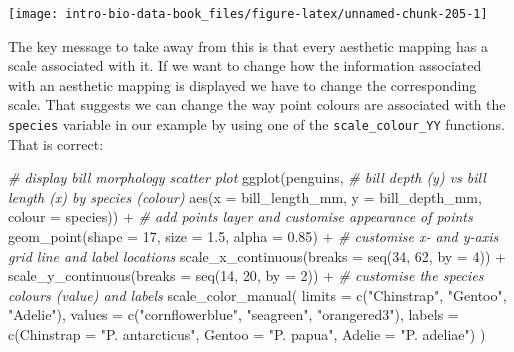 \documentclass[
]{book}
\newenvironment{Shaded}{\begin{snugshade}}{\end{snugshade}}
\newcommand{\AttributeTok}[1]{\textcolor[rgb]{0.77,0.63,0.00}{#1}}
\newcommand{\CommentTok}[1]{\textcolor[rgb]{0.56,0.35,0.01}{\textit{#1}}}
\newcommand{\DecValTok}[1]{\textcolor[rgb]{0.00,0.00,0.81}{#1}}
\newcommand{\FloatTok}[1]{\textcolor[rgb]{0.00,0.00,0.81}{#1}}
\newcommand{\FunctionTok}[1]{\textcolor[rgb]{0.00,0.00,0.00}{#1}}
\newcommand{\NormalTok}[1]{#1}
\newcommand{\SpecialCharTok}[1]{\textcolor[rgb]{0.00,0.00,0.00}{#1}}
\newcommand{\StringTok}[1]{\textcolor[rgb]{0.31,0.60,0.02}{#1}}
\begin{document}
\begin{center}\texttt{[image: intro-bio-data-book\_files/figure-latex/unnamed-chunk-205-1]} \end{center}

The key message to take away from this is that every aesthetic mapping has a scale associated with it. If we want to change how the information associated with an aesthetic mapping is displayed we have to change the corresponding scale. That suggests we can change the way point colours are associated with the \texttt{species} variable in our example by using one of the \texttt{scale\_colour\_YY} functions. That is correct:

\begin{Shaded}
\begin{Highlighting}[]
\CommentTok{\# display bill morphology scatter plot}
\FunctionTok{ggplot}\NormalTok{(penguins, }
       \CommentTok{\# bill depth (y) vs bill length (x) by species (colour)}
       \FunctionTok{aes}\NormalTok{(}\AttributeTok{x =}\NormalTok{ bill\_length\_mm, }\AttributeTok{y =}\NormalTok{ bill\_depth\_mm, }\AttributeTok{colour =}\NormalTok{ species)) }\SpecialCharTok{+} 
  \CommentTok{\# add points layer and customise appearance of points}
  \FunctionTok{geom\_point}\NormalTok{(}\AttributeTok{shape =} \DecValTok{17}\NormalTok{, }\AttributeTok{size =} \FloatTok{1.5}\NormalTok{, }\AttributeTok{alpha =} \FloatTok{0.85}\NormalTok{) }\SpecialCharTok{+} 
  \CommentTok{\# customise x{-} and y{-}axis grid line and label locations}
  \FunctionTok{scale\_x\_continuous}\NormalTok{(}\AttributeTok{breaks =} \FunctionTok{seq}\NormalTok{(}\DecValTok{34}\NormalTok{, }\DecValTok{62}\NormalTok{, }\AttributeTok{by =} \DecValTok{4}\NormalTok{)) }\SpecialCharTok{+}
  \FunctionTok{scale\_y\_continuous}\NormalTok{(}\AttributeTok{breaks =} \FunctionTok{seq}\NormalTok{(}\DecValTok{14}\NormalTok{, }\DecValTok{20}\NormalTok{, }\AttributeTok{by =} \DecValTok{2}\NormalTok{)) }\SpecialCharTok{+} 
  \CommentTok{\# customise the species colours (\textquotesingle{}value\textquotesingle{}) and labels}
  \FunctionTok{scale\_color\_manual}\NormalTok{(}
    \AttributeTok{limits =} \FunctionTok{c}\NormalTok{(}\StringTok{"Chinstrap"}\NormalTok{, }\StringTok{"Gentoo"}\NormalTok{, }\StringTok{"Adelie"}\NormalTok{),}
    \AttributeTok{values =} \FunctionTok{c}\NormalTok{(}\StringTok{"cornflowerblue"}\NormalTok{, }\StringTok{"seagreen"}\NormalTok{, }\StringTok{"orangered3"}\NormalTok{),}
    \AttributeTok{labels =} \FunctionTok{c}\NormalTok{(}\AttributeTok{Chinstrap =} \StringTok{"P. antarcticus"}\NormalTok{, }\AttributeTok{Gentoo =} \StringTok{"P. papua"}\NormalTok{, }\AttributeTok{Adelie =} \StringTok{"P. adeliae"}\NormalTok{)}
\NormalTok{  )}
\end{Highlighting}
\end{Shaded}
\end{document}

